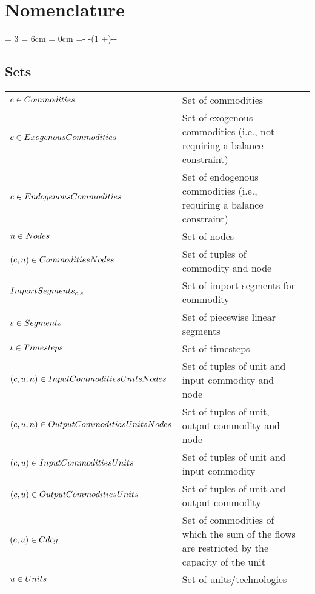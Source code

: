 \section*{Nomenclature}
\newcount\totalcol
\totalcol = 3
\newdimen\cola
\cola = 6cm
\newdimen\colb
\colb = 0cm
\newdimen\colc
\colc =\dimexpr\textwidth -\tabcolsep * -\arrayrulewidth * (1 +\totalcol)-\cola -\colb\relax
\subsection*{Sets}
\vspace{-1em}
	\begin{longtable}{p{\cola} p{\colc} >{\small\raggedleft\arraybackslash\itshape}p{\colb}}
		$c \in Commodities   $	& Set of commodities                                          	&                \\
		$c \in ExogenousCommodities$	& Set of exogenous commodities (i.e., not requiring a balance constraint)	&                \\
		$c \in EndogenousCommodities$	& Set of endogenous commodities (i.e., requiring a balance constraint)	&                \\
		$n \in Nodes         $	& Set of nodes                                                	&                \\
		$(c, n) \in CommoditiesNodes$	& Set of tuples of commodity and node                         	&                \\
		$ImportSegments_{c,s}$	& Set of import segments \segment for commodity \commodity    	&                \\
		$s \in Segments      $	& Set of piecewise linear segments                            	&                \\
		$t \in Timesteps     $	& Set of timesteps                                            	&                \\
		$(c, u, n) \in InputCommoditiesUnitsNodes$	& Set of tuples of unit and input commodity and node          	&                \\
		$(c, u, n) \in OutputCommoditiesUnitsNodes$	& Set of tuples of unit, output commodity and node            	&                \\
		$(c, u) \in InputCommoditiesUnits$	& Set of tuples of unit and input commodity                   	&                \\
		$(c, u) \in OutputCommoditiesUnits$	& Set of tuples of unit and output commodity                  	&                \\
		$(c, u) \in Cdcg          $	& Set of commodities of which the sum of the flows are restricted by the capacity of the unit	&                \\
		$u \in Units         $	& Set of units/technologies                                   	&                \\
	\end{longtable}

